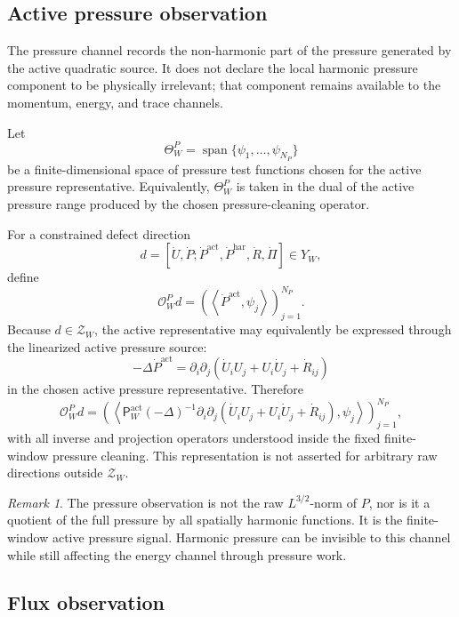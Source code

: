 \documentclass[11pt]{article}
\numberwithin{equation}{section}
\theoremstyle{plain}
\theoremstyle{definition}
\theoremstyle{remark}
\newtheorem{remark}[theorem]{Remark}
\newcommand{\har}{\mathrm{har}}
\newcommand{\pair}[2]{\left\langle #1,#2\right\rangle}
\newcommand{\calO}{\mathcal O}
\newcommand{\calZ}{\mathcal Z}
\newcommand{\act}{\mathrm{act}}
\begin{document}
\subsection{Active pressure observation}

The pressure channel records the non-harmonic part of the pressure generated by the active quadratic source.  It does not declare the local harmonic pressure component to be physically irrelevant; that component remains available to the momentum, energy, and trace channels.

Let
\[
  \Theta_W^P=\operatorname{span}\{\psi_1,\ldots,\psi_{N_P}\}
\]
be a finite-dimensional space of pressure test functions chosen for the active pressure representative.  Equivalently, \(\Theta_W^P\) is taken in the dual of the active pressure range produced by the chosen pressure-cleaning operator.

For a constrained defect direction
\[
  d=[\dot U,\dot P;\dot P^{\act},\dot P^{\har},\dot R,\dot\Pi]\in Y_W,
\]
define
\[
  \calO_W^P d
  =
  \left(
    \pair{\dot P^{\act}}{\psi_j}
  \right)_{j=1}^{N_P}.
\]
Because \(d\in\calZ_W\), the active representative may equivalently be expressed through the linearized active pressure source:
\[
  -\Delta \dot P^{\act}
  =
  \partial_i\partial_j
  \left(
    \dot U_iU_j+U_i\dot U_j+\dot R_{ij}
  \right)
\]
in the chosen active pressure representative.  Therefore
\[
  \calO_W^P d
  =
  \left(
  \left\langle
    \mathsf P_W^{\act}(-\Delta)^{-1}\partial_i\partial_j
    (\dot U_iU_j+U_i\dot U_j+\dot R_{ij}),
    \psi_j
  \right\rangle
  \right)_{j=1}^{N_P},
\]
with all inverse and projection operators understood inside the fixed finite-window pressure cleaning.  This representation is not asserted for arbitrary raw directions outside \(\calZ_W\).

\begin{remark}
The pressure observation is not the raw \(L^{3/2}\)-norm of \(P\), nor is it a quotient of the full pressure by all spatially harmonic functions.  It is the finite-window active pressure signal.  Harmonic pressure can be invisible to this channel while still affecting the energy channel through pressure work.
\end{remark}
\subsection{Flux observation}
\end{document}
